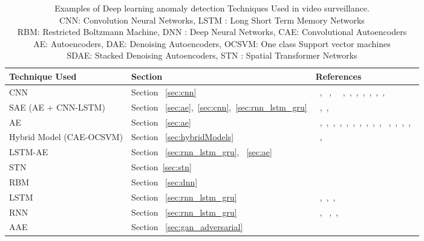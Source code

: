 \begin{table*}
\begin{center}
\caption{Examples of Deep learning anomaly detection Techniques Used in video surveillance.
        \\CNN: Convolution Neural Networks, LSTM : Long Short Term Memory Networks
        \\RBM: Restricted Boltzmann Machine, DNN : Deep Neural Networks, CAE: Convolutional Autoencoders
        \\AE: Autoencoders, DAE: Denoising Autoencoders, OCSVM: One class Support vector machines
        \\SDAE: Stacked Denoising Autoencoders, STN : Spatial Transformer Networks }
  \label{tab:videoSurvellianceAnomalyDetect}
    \begin{tabular}{ | l | p{4cm} | p{6cm} |}
      \hline
      \textbf{Technique Used} & \textbf{Section} & \textbf{References}\\
      \hline
      CNN & Section ~\ref{sec:cnn}   & ~\cite{dong2016camera}, ~\cite{andrewsaanomaly}, ~\cite{sabokrou2016fully}~\cite{sabokrou2017deep},~\cite{munawar2017spatio},~\cite{li2017transferred},~\cite{qiao2017abnormal},~\cite{tripathi2018convolutional},~\cite{nogas2018deepfall},~\cite{christiansen2016deepanomaly},~\cite{li2017transferred}\\\hline
      SAE (AE + CNN-LSTM)  &  Section ~\ref{sec:ae},~\ref{sec:cnn},~\ref{sec:rnn_lstm_gru}  & ~\cite{chong2017abnormal},~\cite{qiao2017abnormal},~\cite{khaleghi2018improved}\\\hline
      AE &  Section ~\ref{sec:ae}  & ~\cite{qiao2017abnormal},~\cite{yang2015unsupervised},~\cite{chen2015detecting},~\cite{gutoskidetection},~\cite{d2017autoencoder},~\cite{dotti2017unsupervised},~\cite{yang2015unsupervised},~\cite{chen2015detecting},~\cite{sabokrou2016video},~\cite{tran2017anomaly},~\cite{chen2015detecting} ,~\cite{d2017autoencoder},~\cite{hasan2016learning},~\cite{yang2015unsupervised},~\cite{cinelli2017anomaly}\\\hline
      Hybrid Model (CAE-OCSVM) & Section ~\ref{sec:hybridModels}  & ~\cite{gutoskidetection}, ~\cite{dotti2017unsupervised}\\\hline
      LSTM-AE &  Section ~\ref{sec:rnn_lstm_gru}, ~\ref{sec:ae}  & ~\cite{d2017autoencoder}\\\hline
      STN &Section~\ref{sec:stn}   & ~\cite{chianucci2016unsupervised}\\\hline
      RBM &Section ~\ref{sec:dnn}   & ~\cite{munawar2017spatio}\\\hline
      LSTM &Section ~\ref{sec:rnn_lstm_gru}  &~\cite{medel2016anomaly},~\cite{luo2017remembering},~\cite{ben2018attentioned},~\cite{singh2017anomaly}\\\hline
      RNN & Section ~\ref{sec:rnn_lstm_gru} &~\cite{luo2017revisit},~\cite{zhou2015abnormal} ,~\cite{hu2016video},~\cite{chong2015modeling}\\\hline
      AAE & Section ~\ref{sec:gan_adversarial} & ~\cite{ravanbakhsh2017training}\\\hline
    \end{tabular}
  \end{center}
\end{table*}
